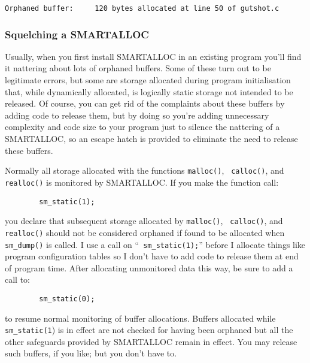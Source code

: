 \footnotesize
\begin{verbatim}
Orphaned buffer:     120 bytes allocated at line 50 of gutshot.c
\end{verbatim}
\normalsize

\subsubsection*{ Squelching a SMARTALLOC}

Usually, when you first install SMARTALLOC in an existing program you'll find
it nattering about lots of orphaned buffers. Some of these turn out to be
legitimate errors, but some are storage allocated during program
initialisation that, while dynamically allocated, is logically static storage
not intended to be released. Of course, you can get rid of the complaints
about these buffers by adding code to release them, but by doing so you're
adding unnecessary complexity and code size to your program just to silence
the nattering of a SMARTALLOC, so an escape hatch is provided to eliminate the
need to release these buffers. 

Normally all storage allocated with the functions {\tt malloc()}, {\tt
calloc()}, and {\tt realloc()} is monitored by SMARTALLOC. If you make the
function call: 

\footnotesize
\begin{verbatim}
        sm_static(1);
\end{verbatim}
\normalsize

you declare that subsequent storage allocated by {\tt malloc()}, {\tt
calloc()}, and {\tt realloc()} should not be considered orphaned if found to
be allocated when {\tt sm\_dump()} is called. I use a call on ``{\tt
sm\_static(1);}'' before I allocate things like program configuration tables
so I don't have to add code to release them at end of program time. After
allocating unmonitored data this way, be sure to add a call to: 

\footnotesize
\begin{verbatim}
        sm_static(0);
\end{verbatim}
\normalsize

to resume normal monitoring of buffer allocations. Buffers allocated while
{\tt sm\_static(1}) is in effect are not checked for having been orphaned but
all the other safeguards provided by SMARTALLOC remain in effect. You may
release such buffers, if you like; but you don't have to. 

